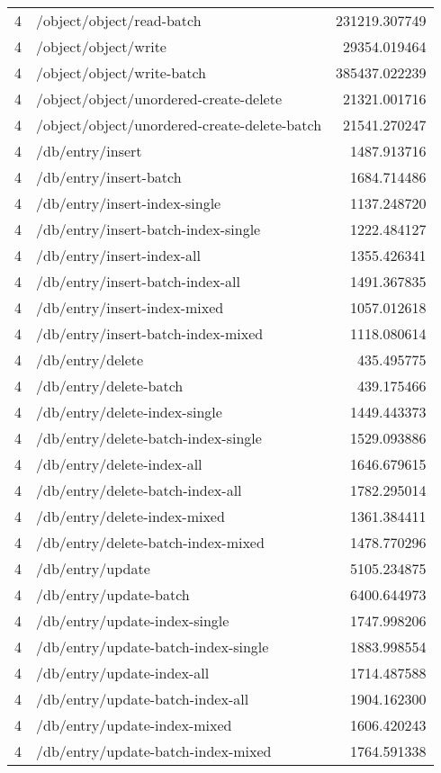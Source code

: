 \begin{longtable}{rlr}
4 & /object/object/read-batch & 231219.307749 \\
4 & /object/object/write & 29354.019464 \\
4 & /object/object/write-batch & 385437.022239 \\
4 & /object/object/unordered-create-delete & 21321.001716 \\
4 & /object/object/unordered-create-delete-batch & 21541.270247 \\
4 & /db/entry/insert & 1487.913716 \\
4 & /db/entry/insert-batch & 1684.714486 \\
4 & /db/entry/insert-index-single & 1137.248720 \\
4 & /db/entry/insert-batch-index-single & 1222.484127 \\
4 & /db/entry/insert-index-all & 1355.426341 \\
4 & /db/entry/insert-batch-index-all & 1491.367835 \\
4 & /db/entry/insert-index-mixed & 1057.012618 \\
4 & /db/entry/insert-batch-index-mixed & 1118.080614 \\
4 & /db/entry/delete & 435.495775 \\
4 & /db/entry/delete-batch & 439.175466 \\
4 & /db/entry/delete-index-single & 1449.443373 \\
4 & /db/entry/delete-batch-index-single & 1529.093886 \\
4 & /db/entry/delete-index-all & 1646.679615 \\
4 & /db/entry/delete-batch-index-all & 1782.295014 \\
4 & /db/entry/delete-index-mixed & 1361.384411 \\
4 & /db/entry/delete-batch-index-mixed & 1478.770296 \\
4 & /db/entry/update & 5105.234875 \\
4 & /db/entry/update-batch & 6400.644973 \\
4 & /db/entry/update-index-single & 1747.998206 \\
4 & /db/entry/update-batch-index-single & 1883.998554 \\
4 & /db/entry/update-index-all & 1714.487588 \\
4 & /db/entry/update-batch-index-all & 1904.162300 \\
4 & /db/entry/update-index-mixed & 1606.420243 \\
4 & /db/entry/update-batch-index-mixed & 1764.591338 \\

\end{longtable}
